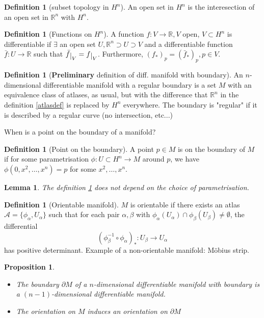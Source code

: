 \documentclass[a4paper,11pt,titlepage]{article}
\numberwithin{equation}{section}
\newtheorem{proposition}[theorem]{Proposition}
\newtheorem{lemma}[theorem]{Lemma}
\theoremstyle{definition}
\newtheorem{definition}[theorem]{Definition}
\theoremstyle{remark}
\newcommand{\rfield}{\mathbb{R}}
\newcommand{\restrict}[2]{{#1}\raisebox{-.5ex}{$|$}_{#2}}
\begin{document}
\begin{definition}[subset topology in $H^n$]
  An open set in $H^n$ is the interesection of an open set in $\rfield^n$ with $H^n$.
\end{definition}

\begin{definition}[Functions on $H^n$]
  A function $f \colon V \rightarrow \rfield, V$ open, $V \subset H^n$ is differentiable if $\exists$ an open set $U, \rfield^n \supset U \supset V$ and a differentiable function
  $\bar f \colon U \rightarrow \rfield$ such that $\restrict{\bar f}{V} = \restrict{f}{V}$.
  Furthermore, $(f_*)_p = (\bar f_*)_p, p \in V$.
\end{definition}

\begin{definition}[\textbf{Preliminary} definition of diff. manifold with boundary]
  An $n$-dimensional differentiable manifold with a regular boundary is a set $M$ with an equivalence class of atlases, as usual, but with the difference that $\rfield^n$ in the definition \ref{atlasdef} is replaced by $H^n$ everywhere. The boundary is "regular" if it is described by a regular curve (no intersection, etc...)
\end{definition}

When is a point on the boundary of a manifold?
\begin{definition} [Point on the boundary] \label{pointbdr}
  A point $p \in M$ is on the boundary of $M$ if for some parametrisation $\phi \colon U \subset H^n \rightarrow M$ around $p$, we have $\phi(0, x^2, \ldots, x^n) = p$ for some $x^2, \ldots, x^n$.
\end{definition}%

\begin{lemma}
  The definition \ref{pointbdr} does not depend on the choice of parametrisation.
\end{lemma}

\begin{definition} [Orientable manifold]
  $M$ is orientable if there exists an atlas $\mathcal{A} = \{\phi_{\alpha}, U_{\alpha}\}$ such that for each pair $\alpha, \beta$ with $\phi_{\alpha}(U_{\alpha}) \cap \phi_{\beta}(U_{\beta}) \not = \emptyset$, the differential
  $$
    (\phi_{\beta}^{-1} \circ \phi_{\alpha})_* \colon  U_{\beta} \rightarrow U_{\alpha}
  $$
  has positive determinant. Example of a non-orientable manifold: Möbius strip.
\end{definition}

\begin{proposition}
  \begin{itemize}
    \item The boundary $\partial M$ of a $n$-dimensional differentiable manifold with boundary is a $(n-1)$-dimensional differentiable manifold. %
    \item The orientation on $M$ induces an orientation on $\partial M$
  \end{itemize}
\end{proposition}
\end{document}
